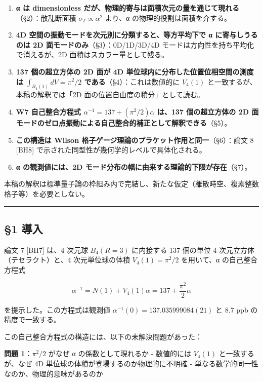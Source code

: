 \documentclass[
  11pt]{ltjsarticle}
\providecommand{\tightlist}{%
  \setlength{\itemsep}{0pt}\setlength{\parskip}{0pt}}
\begin{document}
\begin{enumerate}
\def\labelenumi{\arabic{enumi}.}
\tightlist
\item
  \textbf{α は dimensionless
  だが、物理的寄与は面積次元の量を通じて現れる}（§2）：散乱断面積
  \(\sigma_T \propto \alpha^2\) より、α の物理的役割は面積を介する。
\item
  \textbf{4D 空間の振動モードを次元別に分類すると、等方平均下で α
  に寄与しうるのは 2D 面モードのみ}（§3）：0D/1D/3D/4D
  モードは方向性を持ち平均化で消えるが、2D 面積はスカラー量として残る。
\item
  \textbf{137 個の超立方体の 2D 面が 4D
  単位球内に分布した位置位相空間の測度は \(\int_{B_4(1)} dV = \pi^2/2\)
  である}（§4）：これは数値的に \(V_4(1)\)
  と一致するが、本稿の解釈では「2D 面の位置自由度の積分」として読む。
\item
  \textbf{W7 自己整合方程式 \(\alpha^{-1} = 137 + (\pi^2/2)\alpha\)
  は、137 個の超立方体の 2D
  面モードのゼロ点振動による自己整合的補正として解釈できる}（§5）。
\item
  \textbf{この構造は Wilson
  格子ゲージ理論のプラケット作用と同一}（§6）：論文 8 {[}BH8{]}
  で示された同型性が幾何学的レベルで具体化される。
\item
  \textbf{α の観測値には、2D
  モード分布の幅に由来する理論的下限が存在}（§7）。
\end{enumerate}

本稿の解釈は標準量子論の枠組み内で完結し、新たな仮定（離散時空、複素整数格子等）を必要としない。

\begin{center}\rule{0.5\linewidth}{0.5pt}\end{center}

\subsection{§1 導入}\label{ux5c0eux5165}

論文 7 {[}BH7{]} は、4 次元球 \(B_4(R=3)\) に内接する 137 個の単位 4
次元立方体（テセラクト）と、4 次元単位球の体積 \(V_4(1) = \pi^2/2\)
を用いて、α の自己整合方程式

\[\alpha^{-1} = N(1) + V_4(1)\alpha = 137 + \frac{\pi^2}{2}\alpha\]

を提示した。この方程式は観測値 \(\alpha^{-1}(0) = 137.035999084(21)\) と
8.7 ppb の精度で一致する。

この自己整合方程式の構造には、以下の未解決問題があった：

\textbf{問題 1}：\(\pi^2/2\) がなぜ α の係数として現れるか - 数値的には
\(V_4(1)\) と一致するが、なぜ 4D
単位球の体積が登場するのか物理的に不明確 -
単なる数学的同一性なのか、物理的意味があるのか
\end{document}
